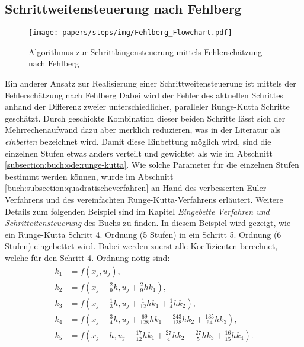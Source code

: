 \subsection{Schrittweitensteuerung nach Fehlberg
  \label{steps:subsection:fehlberg}}
\begin{figure}
  \centering
  \texttt{[image: papers/steps/img/Fehlberg\_Flowchart.pdf]}
  \caption{Algorithmus zur Schrittlängensteuerung mittels Fehlerschätzung nach Fehlberg
  \cite{steps:Numerische-Mathematik}
    \label{buch:steps:flowchartfehlberg}}
\end{figure}%
Ein anderer Ansatz zur Realisierung einer Schrittweitensteuerung ist mittels der Fehlerschätzung nach Fehlberg
%
%
Dabei wird der Fehler des aktuellen Schrittes anhand der Differenz zweier unterschiedlicher, paralleler
Runge-Kutta Schritte geschätzt. Durch geschickte Kombination dieser beiden Schritte
lässt sich der Mehrrechenaufwand dazu aber merklich reduzieren, was in der Literatur als \textit{einbetten} bezeichnet wird.
%
Damit diese Einbettung möglich wird, sind die einzelnen Stufen etwas anders verteilt und gewichtet als wie im Abschnitt
\ref{subsection:buch:ode:runge-kutta}.
Wie solche Parameter für die einzelnen Stufen bestimmt werden können, wurde im Abschnitt
\ref{buch:subsection:quadratischeverfahren}
an Hand des verbesserten Euler-Verfahrens und des vereinfachten Runge-Kutta-Verfahrens
erläutert.
Weitere Details zum folgenden Beispiel sind im Kapitel \textit{Eingebette Verfahren und Schritteitensteuerung}
des Buchs
\cite{steps:Numerische-Mathematik}
zu finden.
In diesem Beispiel wird gezeigt, wie ein Runge-Kutta Schritt 4. Ordnung (5 Stufen) in ein Schritt 5. Ordnung (6 Stufen) eingebettet wird.
Dabei werden zuerst alle Koeffizienten berechnet, welche für den Schritt 4. Ordnung nötig sind:
\begin{align*}
  k_1 & =f(x_j, u_j),                                                                           \\
  k_2 & =f\left(x_j + \frac{2}{9}h, u_j+\frac{2}{9}hk_1\right),                                            \\
  k_3 & =f\left(x_j + \frac{1}{3}h, u_j+\frac{1}{12}hk_1+\frac{1}{4}hk_2\right),                           \\
  k_4 & =f\left(x_j + \frac{3}{4}h, u_j+\frac{69}{128}hk_1-\frac{243}{128}hk_2+\frac{135}{64}hk_3\right),  \\
  k_5 & =f\left(x_j + h, u_j-\frac{17}{12}hk_1+\frac{27}{4}hk_2-\frac{27}{5}hk_3+\frac{16}{15}hk_4\right).
\end{align*}
